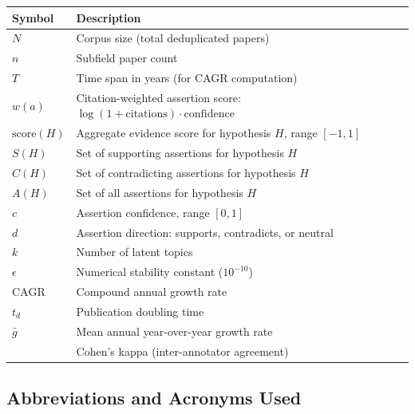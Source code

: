 \documentclass[
]{article}
\newcounter{none} %
\begin{document}
{\def\LTcaptype{none} %
\begin{longtable}[]{@{}
  >{\raggedright\arraybackslash}p{}
  >{\raggedright\arraybackslash}p{}@{}}
\toprule\noalign{}
\begin{minipage}[b]{\linewidth}\raggedright
Symbol
\end{minipage} & \begin{minipage}[b]{\linewidth}\raggedright
Description
\end{minipage} \\
\midrule\noalign{}
\endhead
\bottomrule\noalign{}
\endlastfoot
\(N\) & Corpus size (total deduplicated papers) \\
\(n\) & Subfield paper count \\
\(T\) & Time span in years (for CAGR computation) \\
\(w(a)\) & Citation-weighted assertion score:
\(\log(1 + \text{citations}) \cdot \text{confidence}\) \\
\(\text{score}(H)\) & Aggregate evidence score for hypothesis \(H\),
range \([-1, 1]\) \\
\(S(H)\) & Set of supporting assertions for hypothesis \(H\) \\
\(C(H)\) & Set of contradicting assertions for hypothesis \(H\) \\
\(A(H)\) & Set of all assertions for hypothesis \(H\) \\
\(c\) & Assertion confidence, range \([0, 1]\) \\
\(d\) & Assertion direction: supports, contradicts, or neutral \\
\(k\) & Number of latent topics \\
\(\epsilon\) & Numerical stability constant (\(10^{-10}\)) \\
\(\text{CAGR}\) & Compound annual growth rate \\
\(t_d\) & Publication doubling time \\
\(\bar{g}\) & Mean annual year-over-year growth rate \\
\(\kappa) & Cohen's kappa (inter-annotator agreement) \\
\end{longtable}
}

\subsection{Abbreviations and Acronyms
Used}\label{abbreviations-and-acronyms-used}
\end{document}

